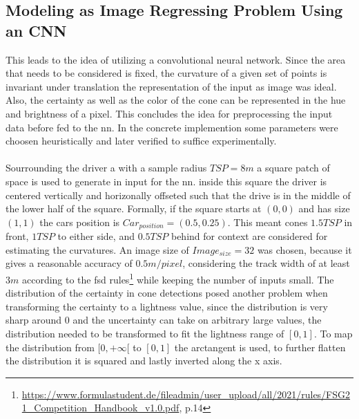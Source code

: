 \subsection{Modeling as Image Regressing Problem Using an CNN}
This leads to the idea of utilizing a convolutional neural network. Since the area that needs to be considered is fixed, the curvature of a given set of points is invariant under translation the representation of the input as image was ideal. Also, the certainty as well as the color of the cone can be represented in the hue and brightness of a pixel. This concludes the idea for preprocessing the input data before fed to the \ac{nn}. In the concrete implemention some parameters were choosen heuristically and later verified to suffice experimentally.\\
\\
Sourrounding the driver a with a sample radius $TSP = 8m$ a square patch of space is used to generate in input for the \ac{nn}. inside this square the driver is centered vertically and horizonally offseted such that the drive is in the middle of the lower half of the square. Formally, if the square starts at $(0,0)$ and has size $(1,1)$ the cars position is $Car_{position}=(0.5,0.25)$. This meant cones $1.5TSP$ in front, $1TSP$ to either side, and $0.5TSP$ behind for context are considered for estimating the curvatures. An image size of $Image_{size}=32$ was chosen, because it gives a reasonable accuracy of $0.5m/pixel$, considering the track width of at least $3m$ according to the \ac{fsd} rules\footnote{\url{https://www.formulastudent.de/fileadmin/user_upload/all/2021/rules/FSG21_Competition_Handbook_v1.0.pdf}, p.14} while keeping the number of inputs small. The distribution of the certainty in cone detections posed another problem when transforming the certainty to a lightness value, since the distribution is very sharp around 0 and the uncertainty can take on arbitrary large values, the distribution needed to be transformed to fit the lightness range of $[0,1]$. To map the distribution from $[0,+\infty[$ to $[0,1]$ the arctangent is used, to further flatten the distribution it is squared and lastly inverted along the x axis. 
